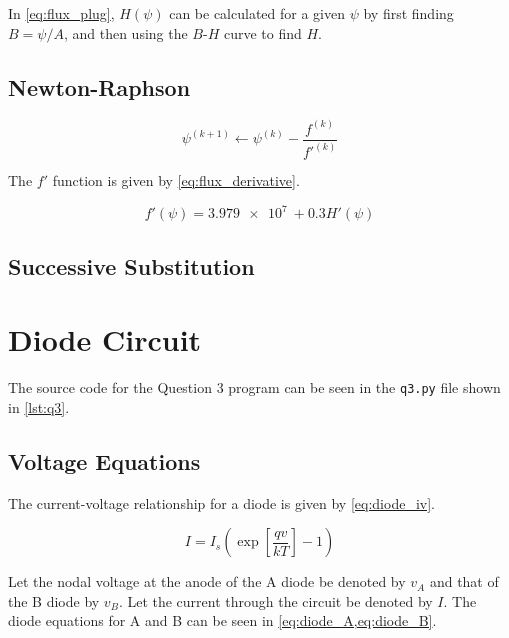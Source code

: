 \documentclass[a4paper,titlepage]{article}
\begin{document}
	\begin{equation} \label{eq:flux_plug}
		
	\end{equation}
	
	In \cref{eq:flux_plug}, $H(\psi)$ can be calculated for a given $\psi$ by first finding $B = \psi / A$, and then using the $B$-$H$ curve to find $H$.
	
	\subsection{Newton-Raphson}
	
	\begin{equation} \label{eq:newton_raphson}
		\psi^{(k+1)} \leftarrow \psi^{(k)} - \frac{f^{(k)}}{{f'}^{(k)}}
	\end{equation}
	
	The $f'$ function is given by \cref{eq:flux_derivative}.
	
	\begin{equation} \label{eq:flux_derivative}
		f'(\psi) = \SI{3.979e7}{} + 0.3H'(\psi)
	\end{equation}
	
	
	\subsection{Successive Substitution}
	
	
	\section{Diode Circuit}
	The source code for the Question 3 program can be seen in the \texttt{q3.py} file shown in \cref{lst:q3}.
	
	\subsection{Voltage Equations}
	The current-voltage relationship for a diode is given by \cref{eq:diode_iv}.
	
	\begin{equation} \label{eq:diode_iv}
		I = I_s \left( \exp\left[{\frac{qv}{kT}}\right] - 1\right)
	\end{equation}
	
	Let the nodal voltage at the anode of the A diode be denoted by $v_A$ and that of the B diode by $v_B$. Let the current through the circuit be denoted by $I$. The diode equations for A and B can be seen in \cref{eq:diode_A,eq:diode_B}.
	
\end{document}
